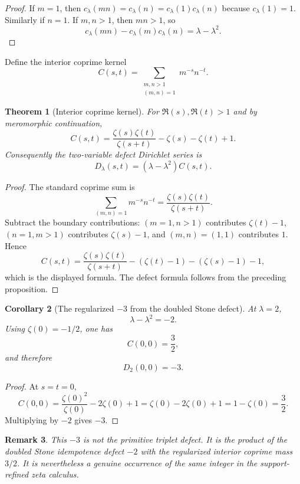\documentclass[11pt]{amsart}
\newtheorem{theorem}{Theorem}[section]
\newtheorem{corollary}[theorem]{Corollary}
\newtheorem{remark}[theorem]{Remark}
\begin{document}
\begin{proof}
If $m=1$, then $c_\lambda(mn)=c_\lambda(n)=c_\lambda(1)c_\lambda(n)$ because $c_\lambda(1)=1$.  Similarly if $n=1$.  If $m,n>1$, then $mn>1$, so
\[
       c_\lambda(mn)-c_\lambda(m)c_\lambda(n)=\lambda-\lambda^2.
\]
\end{proof}

Define the interior coprime kernel
\[
       C(s,t)=\sum_{\substack{m,n>1\\(m,n)=1}}m^{-s}n^{-t}.
\]

\begin{theorem}[Interior coprime kernel]
For $\Re(s),\Re(t)>1$ and by meromorphic continuation,
\[
       C(s,t)=\frac{\zeta(s)\zeta(t)}{\zeta(s+t)}-\zeta(s)-\zeta(t)+1.
\]
Consequently the two-variable defect Dirichlet series is
\[
       D_\lambda(s,t)=(\lambda-\lambda^2)C(s,t).
\]
\end{theorem}

\begin{proof}
The standard coprime sum is
\[
       \sum_{(m,n)=1}m^{-s}n^{-t}=\frac{\zeta(s)\zeta(t)}{\zeta(s+t)}.
\]
Subtract the boundary contributions: $(m=1,n>1)$ contributes $\zeta(t)-1$, $(n=1,m>1)$ contributes $\zeta(s)-1$, and $(m,n)=(1,1)$ contributes $1$.  Hence
\[
       C(s,t)=\frac{\zeta(s)\zeta(t)}{\zeta(s+t)}-(\zeta(t)-1)-(\zeta(s)-1)-1,
\]
which is the displayed formula.  The defect formula follows from the preceding proposition.\end{proof}

\begin{corollary}[The regularized $-3$ from the doubled Stone defect]
At $\lambda=2$,
\[
       \lambda-\lambda^2=-2.
\]
Using $\zeta(0)=-1/2$, one has
\[
       C(0,0)=\frac32,
\]
and therefore
\[
       D_2(0,0)=-3.
\]
\end{corollary}

\begin{proof}
At $s=t=0$,
\[
       C(0,0)=\frac{\zeta(0)^2}{\zeta(0)}-2\zeta(0)+1=\zeta(0)-2\zeta(0)+1=1-\zeta(0)=\frac32.
\]
Multiplying by $-2$ gives $-3$.\end{proof}

\begin{remark}
This $-3$ is not the primitive triplet defect.  It is the product of the doubled Stone idempotence defect $-2$ with the regularized interior coprime mass $3/2$.  It is nevertheless a genuine occurrence of the same integer in the support-refined zeta calculus.
\end{remark}
\end{document}
